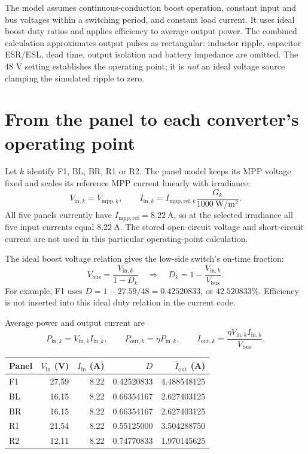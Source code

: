 \documentclass[11pt,a4paper]{article}
\begin{document}
The model assumes continuous-conduction boost operation, constant input and bus
voltages within a switching period, and constant load current. It uses ideal
boost duty ratios and applies efficiency to average output power. The combined
calculation approximates output pulses as rectangular: inductor ripple,
capacitor ESR/ESL, dead time, output isolation and battery impedance are omitted.
The 48 V setting establishes the operating point; it is \emph{not} an ideal
voltage source clamping the simulated ripple to zero.

\section{From the panel to each converter's operating point}

Let $k$ identify F1, BL, BR, R1 or R2. The panel model keeps its MPP voltage
fixed and scales its reference MPP current linearly with irradiance:
\[
 V_{\mathrm{in},k}=V_{\mathrm{mpp},k},\qquad
 I_{\mathrm{in},k}=I_{\mathrm{mpp,ref},k}
       \frac{G_k}{1000\ \mathrm{W/m^2}}.
\]
All five panels currently have $I_{\mathrm{mpp,ref}}=8.22\ \mathrm{A}$, so
at the selected irradiance all five input currents equal $8.22\ \mathrm{A}$.
The stored open-circuit voltage and short-circuit current are not used in this
particular operating-point calculation.

The ideal boost voltage relation gives the low-side switch's on-time fraction:
\[
 V_{\mathrm{bus}}=\frac{V_{\mathrm{in},k}}{1-D_k}
 \quad\Longrightarrow\quad
 \boxed{D_k=1-\frac{V_{\mathrm{in},k}}{V_{\mathrm{bus}}}}.
\]
For example, F1 uses $D=1-27.59/48=0.42520833$, or $42.520833\%$.
Efficiency is not inserted into this ideal duty relation in the current code.

Average power and output current are
\[
 P_{\mathrm{in},k}=V_{\mathrm{in},k}I_{\mathrm{in},k},\qquad
 P_{\mathrm{out},k}=\eta P_{\mathrm{in},k},\qquad
 \boxed{\overline I_{\mathrm{out},k}
       =\frac{\eta V_{\mathrm{in},k}I_{\mathrm{in},k}}{V_{\mathrm{bus}}}}.
\]

\begin{center}
\begin{tabular}{lrrrr}
\toprule
Panel & $V_{\mathrm{in}}$ (V) & $I_{\mathrm{in}}$ (A) & $D$ & $\overline I_{\mathrm{out}}$ (A)\\
\midrule
F1 & 27.59 & 8.22 & 0.42520833 & 4.488548125\\
BL & 16.15 & 8.22 & 0.66354167 & 2.627403125\\
BR & 16.15 & 8.22 & 0.66354167 & 2.627403125\\
R1 & 21.54 & 8.22 & 0.55125000 & 3.504288750\\
R2 & 12.11 & 8.22 & 0.74770833 & 1.970145625\\
\bottomrule
\end{tabular}
\end{center}
\end{document}
